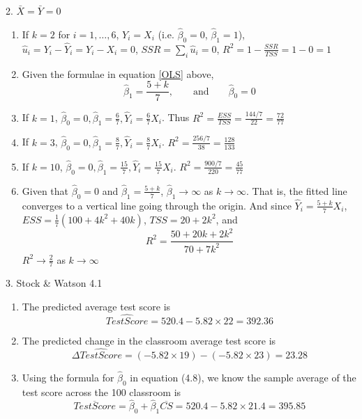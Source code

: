 \documentclass[12pt]{article}
\begin{document}
2. $\bar X=\bar Y=0$
\begin{enumerate}
  \item If $k=2$ for $i=1,\dots,6$, $Y_i=X_i$ (i.e. $\hat\beta_0=0$, $\hat\beta_1=1$), $\hat u_i=Y_i-\hat Y_i=Y_i-X_i=0$, $SSR=\sum_i \hat u_i=0$, $R^2=1-\frac{SSR}{TSS}=1-0=1$
  
  \item Given the formulae in equation \eqref{OLS} above, 
  \begin{equation*}
    \hat\beta_1=\frac{5+k}7,\qquad\text{and}\qquad \hat\beta_0=0
  \end{equation*}
  
  \item If $k=1$, $\hat\beta_0=0,\hat\beta_1=\frac67,\hat Y_i=\frac67X_i$. 
  Thus $R^2=\frac{ESS}{TSS}=\frac{144/7}{22}=\frac{72}{77}$
  
  \item If $k=3$, $\hat\beta_0=0,\hat\beta_1=\frac87,\hat Y_i=\frac87X_i$. $R^2=\frac{256/7}{38}=\frac{128}{133}$
  
  \item If $k=10$, $\hat\beta_0=0,\hat\beta_1=\frac{15}7,\hat Y_i=\frac{15}7X_i$. $R^2=\frac{900/7}{220}=\frac{45}{77}$
  
  \item Given that $\hat\beta_0=0$ and $\hat\beta_1=\frac{5+k}7$, $\hat\beta_1\to\infty$ as $k\to\infty$.
  That is, the fitted line converges to a vertical line going through the origin.
  And since $\hat Y_i=\frac{5+k}7X_i$, $ESS=\frac17(100+4k^2+40k)$, $TSS=20+2k^2$, and 
  \begin{equation*}
    R^2=\frac{50+20k+2k^2}{70+7k^2}
  \end{equation*}
  $R^2\to\frac27$ as $k\to\infty$
\end{enumerate}



3. Stock \& Watson 4.1
\begin{enumerate}
  \item The predicted average test score is 
  \begin{equation*}
    \widehat{TestScore}=520.4-5.82\times22=392.36
  \end{equation*}
  
  \item The predicted change in the classroom average test score is
  \begin{equation*}
    \Delta\widehat{TestScore}=(-5.82\times19)-(-5.82\times23)=23.28
  \end{equation*}
  
  \item Using the formula for $\hat\beta_0$ in equation (4.8), we know the sample average of the test score across the 100 classroom is 
  \begin{equation*}
    \overline{TestScore}=\hat\beta_0+\hat\beta_1\overline{CS}=520.4-5.82\times21.4=395.85
  \end{equation*}
\end{enumerate}
\end{document}
